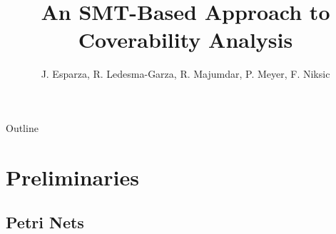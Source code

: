 \documentclass{beamer}
\title{An SMT-Based Approach to Coverability Analysis}
\subtitle{}
\author{J. Esparza, R. Ledesma-Garza, R.  Majumdar, P. Meyer, F. Niksic }
\begin{document}
\begin{frame}
  \titlepage
\end{frame}

\begin{frame}{Outline}
  \tableofcontents
\end{frame}


\section{Preliminaries}

\subsection{Petri Nets} %
\end{document}
